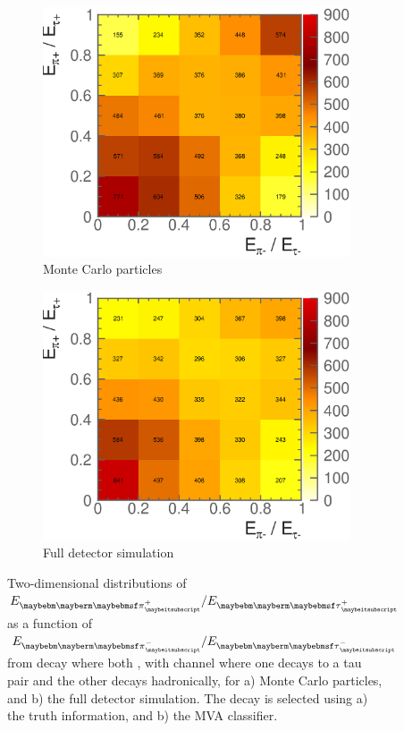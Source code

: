 \begin{figure}[htbp]
\centering %
\begin{subfigure}[b]{0.75\textwidth}
  \includegraphics[width=\textwidth]{tau/NoTimeAnalysis/2DMC}
  \caption{Monte Carlo particles}
  \label{fig:TauSpin2DMC}
\end{subfigure}
\begin{subfigure}[b]{0.75\textwidth}
  \includegraphics[width=\textwidth]{tau/NoTimeAnalysis/2Dreco}
  \caption{Full detector simulation}
  \label{fig:TauSpin2Dreco}
\end{subfigure}
\caption
{Two-dimensional distributions of $E_{\Ppiplus}/E_{\APtauon}$ as a function of $E_{\Ppiminus}/E_{\Ptauon}$ from \ZToTauTau decay where both \tauToPion, with \eeZZ channel where one \PZ decays to a tau pair and the other \PZ decays hadronically,  for a) Monte Carlo particles, and b) the full detector simulation. The \tauToPion decay is selected using a) the truth information, and b) the MVA classifier.}
\label{fig:TauSpin2D}
\end{figure}
